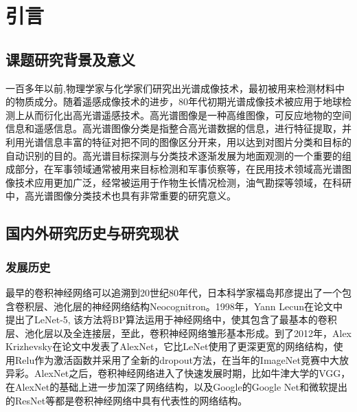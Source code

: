 \section{引言}

\subsection{课题研究背景及意义}

一百多年以前,物理学家与化学家们研究出光谱成像技术，最初被用来检测材料中的物质成分。随着遥感成像技术的进步，80年代初期光谱成像技术被应用于地球检测上从而衍化出高光谱遥感技术\cite{ref9}。高光谱图像是一种高维图像，可反应地物的空间信息和遥感信息。高光谱图像分类是指整合高光谱数据的信息，进行特征提取，并利用光谱信息丰富的特征对把不同的图像区分开来，用以达到对图片分类和目标的自动识别的目的。高光谱目标探测与分类技术逐渐发展为地面观测的一个重要的组成部分，在军事领域通常被用来目标检测和军事侦察等，在民用技术领域高光谱图像技术应用更加广泛，经常被运用于作物生长情况检测，油气勘探等领域，在科研中，高光谱图像分类技术也具有非常重要的研究意义。

\subsection{国内外研究历史与研究现状}

\subsubsection{发展历史}

最早的卷积神经网络可以追溯到20世纪80年代，日本科学家福岛邦彦提出了一个包含卷积层、池化层的神经网络结构Neocognitron\cite{ref1}。1998年，Yann Lecun在论文中提出了LeNet-5\cite{ref2}, 该方法将BP算法运用于神经网络中，使其包含了最基本的卷积层、池化层以及全连接层，至此，卷积神经网络雏形基本形成。到了2012年，Alex Krizhevsky在论文中发表了AlexNet\cite{ref3}，它比LeNet使用了更深更宽的网络结构，使用Relu作为激活函数并采用了全新的dropout方法，在当年的ImageNet竞赛中大放异彩。AlexNet之后，卷积神经网络进入了快速发展时期，比如牛津大学的VGG\cite{ref4}，在AlexNet的基础上进一步加深了网络结构，以及Google的Google Net\cite{ref5}和微软提出的ResNet\cite{ref6}等都是卷积神经网络中具有代表性的网络结构。